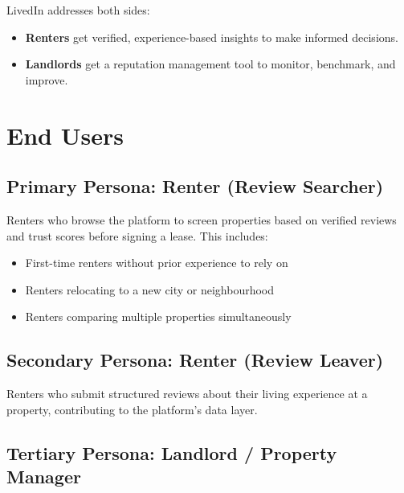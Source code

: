 \documentclass[11pt,letterpaper]{article}
\begin{document}
LivedIn addresses both sides:
\begin{itemize}
    \item \textbf{Renters} get verified, experience-based insights to make informed decisions.
    \item \textbf{Landlords} get a reputation management tool to monitor, benchmark, and improve.
\end{itemize}

\section{End Users}

\subsection{Primary Persona: Renter (Review Searcher)}

Renters who browse the platform to screen properties based on verified reviews and trust scores before signing a lease. This includes:
\begin{itemize}
    \item First-time renters without prior experience to rely on
    \item Renters relocating to a new city or neighbourhood
    \item Renters comparing multiple properties simultaneously
\end{itemize}

\subsection{Secondary Persona: Renter (Review Leaver)}

Renters who submit structured reviews about their living experience at a property, contributing to the platform's data layer.

\subsection{Tertiary Persona: Landlord / Property Manager}
\end{document}
